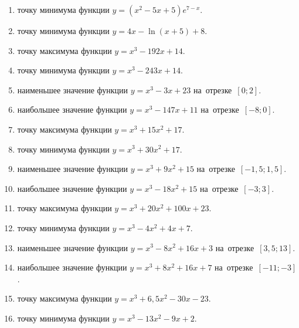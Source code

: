 \documentclass[a4paper,10pt]{article}
\begin{document}
\begin{enumerate}
\item {} точку минимума функции $y=\left(x^2-5x+5\right){{e}^{7-x}}$.

\item {} точку минимума функции $y=4x-\ln \left(x+5\right)+8$.

\item {} точку максимума функции $y=x^3 -192x +14$.

\item {} точку минимума функции $y=x^3 -243x+14$.

\item {} наименьшее значение функции $y=x^3 -3x+23$ на~отрезке~$\left[0;2\right]$.

\item {} наибольшее значение функции $y=x^3 -147x+11$ на~отрезке~$\left[-8;0\right]$.

\item {} точку максимума функции $y=x^3 +15x^2+17$.

\item {} точку минимума функции $y=x^3 +30x^2+17$.

\item {} наименьшее значение функции $y=x^3 +9x^2+15$ на~отрезке~$\left[-1,5;1,5\right]$.

\item {} наибольшее значение функции $y=x^3 -18x^2+15$ на~отрезке~$\left[-3;3\right]$.

\item {} точку максимума функции $y=x^3 +20x^2+100x+23$.

\item {} точку минимума функции $y=x^3 -4x^2+4x+7$.

\item {} наименьшее значение функции $y=x^3 -8x^2+16x+3$ на~отрезке~$\left[3,5;13\right]$.

\item {} наибольшее значение функции $y=x^3 +8x^2+16x+7$ на~отрезке~$\left[-11;-3\right]$.

\item {} точку максимума функции $y=x^3 +6,5x^2-30x-23$.

\item {} точку минимума функции $y=x^3 -13x^2-9x+2$.


\end{enumerate}
\end{document}
